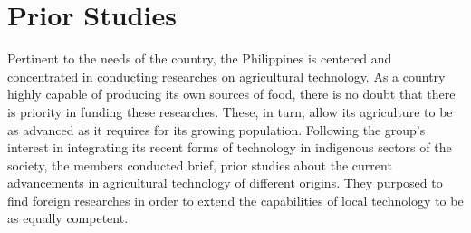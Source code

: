 \section{Prior Studies}
Pertinent to the needs of the country, the Philippines is centered and concentrated in conducting researches on agricultural technology. As a country highly capable of producing its own sources of food, there is no doubt that there is priority in funding these researches. These, in turn, allow its agriculture to be as advanced as it requires for its growing population. Following the group’s interest in integrating its recent forms of technology in indigenous sectors of the society, the members conducted brief, prior studies about the current advancements in agricultural technology of different origins. They purposed to find foreign researches in order to extend the capabilities of local technology to be as equally competent.
